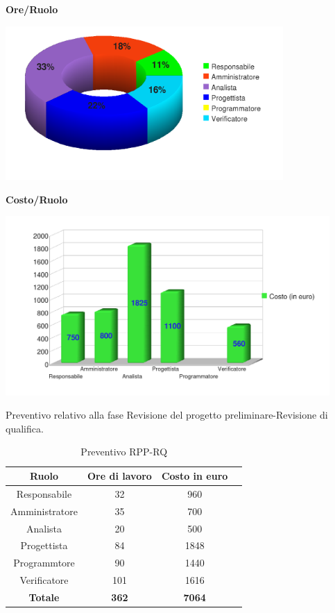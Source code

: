 \begin{center}\textbf{Ore/Ruolo}
\end{center}
\includegraphics[width=300pt]{RR-RPP_Ore}
\newpage
\begin{center}\textbf{Costo/Ruolo}
\end{center}
\includegraphics[width=350pt]{RR-RPP_Costi}


Preventivo relativo alla fase Revisione del progetto preliminare-Revisione di qualifica.
\begin{table}[h]
	\begin{center}
		  \begin{tabular}{|c|c|c|c|}
		 \hline 
		 \textbf{Ruolo} & \textbf{Ore di lavoro} & \textbf{Costo in euro}\\
		 \hline
		Responsabile & 32 & 960 \\
		Amministratore & 35 & 700\\
		Analista & 20 & 500\\
		Progettista & 84 & 1848\\
		Programmtore & 90 & 1440 \\
		Verificatore & 101 & 1616\\
        \hline
        \textbf{Totale} & \textbf{362} & \textbf{7064}\\
		\hline
		\end{tabular}
	\caption{Preventivo RPP-RQ} 
	\label{tab:tabella_RPP-RQ}
	\end{center}	
\end{table}


